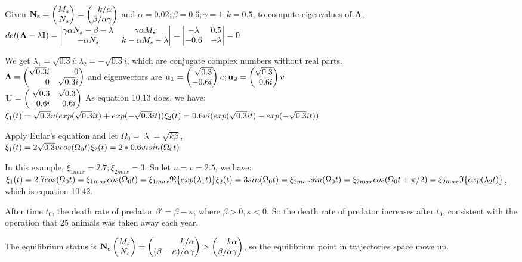 \documentclass[12pt,a4paper]{article}
\begin{document}
Given $\mathbf{N_s}=\newvec{M_s\\N_s}=\newvec{k/\alpha\\\beta/\alpha\gamma}$ and $\alpha=0.02;\beta=0.6;\gamma=1;k=0.5$, to compute eigenvalues of $\mathbf{A}$, \\$det(\mathbf{A-\lambda\mathbf{I}})=\begin{vmatrix} \gamma\alpha N_s-\beta-\lambda&\gamma\alpha M_s\\-\alpha N_s & k-\alpha M_s-\lambda \end{vmatrix}=\begin{vmatrix} -\lambda&0.5\\-0.6&-\lambda \end{vmatrix}=0$

We get $\lambda_1=\sqrt{0.3}i;\lambda_2=-\sqrt{0.3}i$, which are conjugate complex numbers without real parts. \\
$\mathbf{\Lambda}=\newvec{\sqrt{0.3}i&0\\0&\sqrt{0.3}i}$ and eigenvectors are $\mathbf{u_1}=\newvec{\sqrt{0.3}\\-0.6i}u;\mathbf{u_2}=\newvec{\sqrt{0.3}\\0.6i}v$\\
$\mathbf{U}=\newvec{\sqrt{0.3}&\sqrt{0.3}\\-0.6i&0.6i}$
As equation 10.13 does, we have: \\
$\xi_1(t)=\sqrt{0.3}u(exp(\sqrt{0.3}it)+exp(-\sqrt{0.3}it))\\
\xi_2(t)=0.6vi(exp(\sqrt{0.3}it)-exp(-\sqrt{0.3}it))$

Apply Eular's equation and let $\Omega_0=|\lambda|=\sqrt{k\beta}$, \\
$\xi_1(t)=2\sqrt{0.3}ucos(\Omega_0t)\\
\xi_2(t)=2*0.6visin(\Omega_0t)$

In this example, $\xi_{1max}=2.7;\xi_{2max}=3$. So let $u=v=2.5$, we have: \\
$\xi_1(t)=2.7cos(\Omega_0t)=\xi_{1max}cos(\Omega_0t)=\xi_{1max}\mathfrak{R}\{exp(\lambda_1t)\}\\
\xi_2(t)=3sin(\Omega_0t)=\xi_{2max}sin(\Omega_0t)=\xi_{2max}cos(\Omega_0t+\pi/2)=\xi_{2max}\mathfrak{I}\{exp(\lambda_2t)\}$, which is equation 10.42.

\newpage
{}
After time $t_0$, the death rate of predator $\beta'=\beta-\kappa$, where $\beta>0,\kappa<0$. So the death rate of predator increases after $t_0$, consistent with the operation that 25 animals was taken away each year. 

The equilibrium status is $\mathbf{N_s}\newvec{M_s\\N_s}=\newvec{k/\alpha\\(\beta-\kappa)/\alpha\gamma}>\newvec{k\alpha\\\beta/\alpha\gamma}$, so the equilibrium point in trajectories space move up. 
\end{document}
